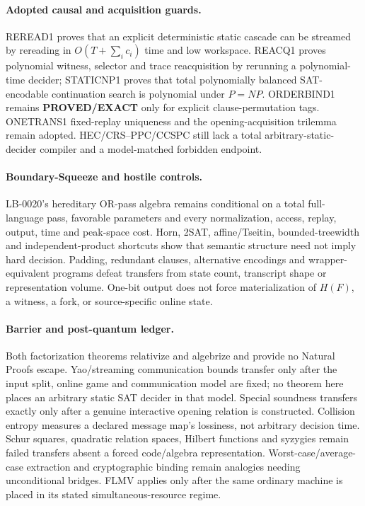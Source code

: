 \documentclass[11pt]{article}
\begin{document}
\paragraph{Adopted causal and acquisition guards.}
REREAD1 proves that an explicit deterministic static cascade can be streamed
by rereading in \(O(T+\sum_i c_i)\) time and low workspace.  REACQ1 proves
polynomial witness, selector and trace reacquisition by rerunning a
polynomial-time decider; STATICNP1 proves that total polynomially balanced
SAT-encodable continuation search is polynomial under \(P=NP\).
ORDERBIND1 remains \textbf{PROVED/EXACT} only for explicit
clause-permutation tags.  ONETRANS1 fixed-replay uniqueness and the
opening-acquisition trilemma remain adopted.  HEC/CRS--PPC/CCSPC still lack a
total arbitrary-static-decider compiler and a model-matched forbidden
endpoint.

\paragraph{Boundary-Squeeze and hostile controls.}
LB-0020's hereditary OR-pass algebra remains conditional on a total
full-language pass, favorable parameters and every normalization, access,
replay, output, time and peak-space cost.  Horn, 2SAT, affine/Tseitin,
bounded-treewidth and independent-product shortcuts show that semantic
structure need not imply hard decision.  Padding, redundant clauses,
alternative encodings and wrapper-equivalent programs defeat transfers from
state count, transcript shape or representation volume.  One-bit output does
not force materialization of \(H(F)\), a witness, a fork, or source-specific
online state.

\paragraph{Barrier and post-quantum ledger.}
Both factorization theorems relativize and algebrize and provide no Natural
Proofs escape.  Yao/streaming communication bounds transfer only after the
input split, online game and communication model are fixed; no theorem here
places an arbitrary static SAT decider in that model.  Special soundness
transfers exactly only after a genuine interactive opening relation is
constructed.  Collision entropy measures a declared message map's lossiness,
not arbitrary decision time.  Schur squares, quadratic relation spaces,
Hilbert functions and syzygies remain failed transfers absent a forced
code/algebra representation.  Worst-case/average-case extraction and
cryptographic binding remain analogies needing unconditional bridges.  FLMV
applies only after the same ordinary machine is placed in its stated
simultaneous-resource regime.
\end{document}
